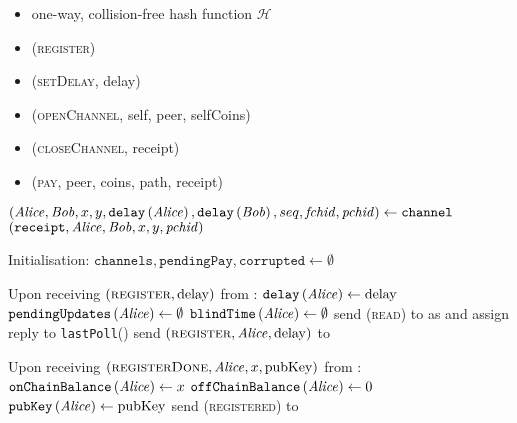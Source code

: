 \begin{functionality}{\fpaynet}
  \label{alg:payfunc}
    \begin{itemize}
      \item one-way, collision-free hash function $\mathcal{H}$
    \end{itemize}

    \begin{itemize}
      \item (\textsc{register})
      \item (\textsc{setDelay}, delay)
      \item (\textsc{openChannel}, self, peer, selfCoins)
      \item (\textsc{closeChannel}, receipt)
      \item (\textsc{pay}, peer, coins, path, receipt)
    \end{itemize}

  \begin{algorithmic}[1]
      \State $\left(\mathit{Alice}, \mathit{Bob}, x, y, \mathtt{delay}\left(\mathit{Alice}\right),
      \mathtt{delay}\left(\mathit{Bob}\right), seq, \mathit{fchid},
      \mathit{pchid}\right) \gets \mathtt{channel}$
      \State \Return $\left(\mathtt{receipt}, \mathit{Alice}, \mathit{Bob}, x, y,
      \mathit{pchid}\right)$
    \EndFunction
    \State

    \State Initialisation:
    \Indent
      \State $\mathtt{channels}, \mathtt{pendingPay}, \mathtt{corrupted} \gets
      \emptyset$
    \EndIndent
    \State

    \State Upon receiving $\left(\textsc{register}, \mathrm{delay}\right)$ from
    \alice:
    \Indent
      \State $\mathtt{delay}\left(\mathit{Alice}\right) \gets \mathrm{delay}$
      \State $\mathtt{pendingUpdates}\left(\mathit{Alice}\right) \gets \emptyset$
      \State $\mathtt{blindTime}\left(\mathit{Alice}\right) \gets \emptyset$
      \State send (\textsc{read}) to \clock{} as \alice{} and assign reply to
      \texttt{lastPoll}(\alice)
      \State send $\left(\textsc{register}, \mathit{Alice}, \mathrm{delay}\right)$ to
      \simulator
    \EndIndent
    \State

    \State Upon receiving $\left(\textsc{registerDone}, \mathit{Alice}, x,
    \mathrm{pubKey}\right)$ from \simulator: 
    \Indent
      \State $\mathtt{onChainBalance}\left(\mathit{Alice}\right) \gets x$
      \State $\mathtt{offChainBalance}\left(\mathit{Alice}\right) \gets 0$
      \State $\mathtt{pubKey}\left(\mathit{Alice}\right) \gets \mathrm{pubKey}$
      \State send (\textsc{registered}) to \alice
    \EndIndent
    \State


\end{algorithmic}
\end{functionality}
